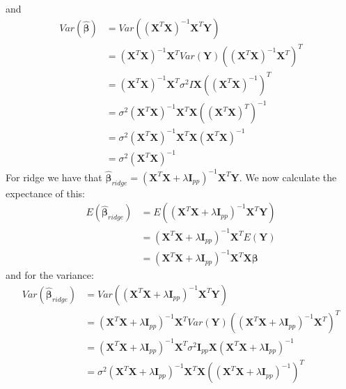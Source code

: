 \documentclass{article}
\begin{document}
and
\begin{align*}
    Var(\hat{\bm{\beta}}) & = Var((\mathbf{X}^T \mathbf{X})^{-1} \mathbf{X}^T \mathbf{Y})                                                              \\
                          & = (\mathbf{X}^T \mathbf{X})^{-1} \mathbf{X}^T Var(\mathbf{Y}) \left( (\mathbf{X}^T \mathbf{X})^{-1} \mathbf{X}^T \right)^T \\
                          & = (\mathbf{X}^T \mathbf{X})^{-1} \mathbf{X}^T \sigma^2 I \mathbf{X} \left( (\mathbf{X}^T \mathbf{X})^{-1} \right)^T        \\
                          & = \sigma^2 (\mathbf{X}^T \mathbf{X})^{-1} \mathbf{X}^T \mathbf{X} \left((\mathbf{X}^T \mathbf{X})^T \right)^{-1}           \\
                          & = \sigma^2 (\mathbf{X}^T \mathbf{X})^{-1} \mathbf{X}^T \mathbf{X} (\mathbf{X}^T \mathbf{X})^{-1}                           \\
                          & = \sigma^2 (\mathbf{X}^T \mathbf{X})^{-1}
\end{align*}
For ridge we have that $\hat{\bm{\beta}}_{ridge} = (\mathbf{X}^T \mathbf{X} + \lambda
    \mathbf{I}_{p p})^{-1} \mathbf{X}^T \mathbf{Y}$. We now calculate the expectance
of this:
\begin{align*}
    E(\hat{\bm{\beta}}_{ridge}) & = E((\mathbf{X}^T \mathbf{X} + \lambda \mathbf{I}_{p p})^{-1} \mathbf{X}^T \mathbf{Y})         \\
                                & = (\mathbf{X}^T \mathbf{X} + \lambda \mathbf{I}_{p p})^{-1} \mathbf{X}^T E(\mathbf{Y})         \\
                                & = (\mathbf{X}^T \mathbf{X} + \lambda \mathbf{I}_{p p})^{-1} \mathbf{X}^T \mathbf{X} \bm{\beta}
\end{align*}
and for the variance:
\begin{align*}
    Var(\hat{\bm{\beta}}_{ridge}) & = Var((\mathbf{X}^T \mathbf{X} + \lambda \mathbf{I}_{p p})^{-1} \mathbf{X}^T \mathbf{Y})                                                                                \\
                                  & = (\mathbf{X}^T \mathbf{X} + \lambda \mathbf{I}_{p p})^{-1} \mathbf{X}^T Var(\mathbf{Y})  ((\mathbf{X}^T \mathbf{X} + \lambda \mathbf{I}_{p p})^{-1} \mathbf{X}^T)^T    \\
                                  & = (\mathbf{X}^T \mathbf{X} + \lambda \mathbf{I}_{p p})^{-1} \mathbf{X}^T \sigma^2 \mathbf{I}_{p p} \mathbf{X} (\mathbf{X}^T \mathbf{X} + \lambda \mathbf{I}_{p p})^{-1} \\
                                  & = \sigma^2 (\mathbf{X}^T \mathbf{X} + \lambda \mathbf{I}_{p p})^{-1} \mathbf{X}^T \mathbf{X} ((\mathbf{X}^T \mathbf{X} + \lambda \mathbf{I}_{p p})^{-1})^T              \\
\end{align*}
\end{document}
